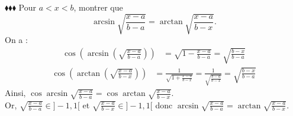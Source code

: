\documentclass[11pt]{article}
\begin{document}
\begin{exercice}{$\blacklozenge\blacklozenge\blacklozenge$}{}
    Pour $a<x<b$, montrer que 
    \begin{equation*}
        \arcsin\sqrt{\frac{x-a}{b-a}}=\arctan\sqrt{\frac{x-a}{b-x}}.
    \end{equation*}
    \tcblower
    On a :
    \begin{align*}
        \cos\left(\arcsin\left(\sqrt{\frac{x-a}{b-a}}\right)\right)&=\sqrt{1-\frac{x-a}{b-a}}=\sqrt{\frac{b-x}{b-a}}
    \end{align*}
    \begin{align*}
        \cos\left(\arctan\left(\sqrt{\frac{x-a}{b-x}}\right)\right)&=\frac{1}{\sqrt{1+\frac{x-a}{b-x}}}=\frac{1}{\sqrt{\frac{b-a}{b-x}}}=\sqrt{\frac{b-x}{b-a}}
    \end{align*}
    Ainsi, $\cos\arcsin\sqrt{\frac{x-a}{b-a}}=\cos\arctan\sqrt{\frac{x-a}{b-x}}$.\\
    Or, $\sqrt{\frac{x-a}{b-a}}\in]-1,1[$ et $\sqrt{\frac{x-a}{b-x}}\in]-1,1[$ donc $\arcsin\sqrt{\frac{x-a}{b-a}}=\arctan\sqrt{\frac{x-a}{b-x}}$.
\end{exercice}
\end{document}
